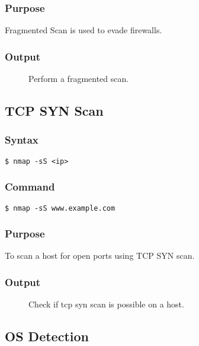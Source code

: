 \documentclass[11pt]{article}
\begin{document}
\subsubsection*{Purpose}
Fragmented Scan is used to evade firewalls.

\subsubsection*{Output}
\begin{figure}[H]
    \centering
    \caption{Perform a fragmented scan. }
    \label{fig:1}
\end{figure}

\subsection{TCP SYN Scan}

\subsubsection{Syntax}
\begin{verbatim}
$ nmap -sS <ip>
\end{verbatim}

\subsubsection*{Command}
\begin{verbatim}
$ nmap -sS www.example.com
\end{verbatim}

\subsubsection*{Purpose}
To scan a host for open ports using TCP SYN scan.

\subsubsection*{Output}
\begin{figure}[H]
    \centering
    \caption{Check if tcp syn scan is possible on a host. }
    \label{fig:1}
\end{figure}

\subsection{OS Detection}
\end{document}
